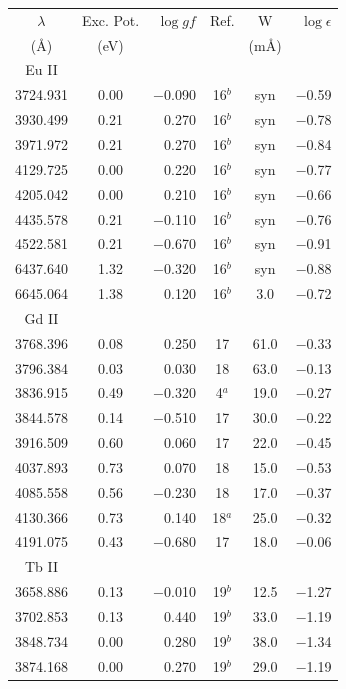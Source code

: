 \documentclass{aa}
\begin{document}
\begin{table}
\begin{tabular}{ccrccr}
\hline\hline
$\lambda$ & Exc. Pot. & $\log gf$ & Ref. & W & $\log \epsilon$ \\
  (\AA)   & (eV)      &           &      & (m\AA) &              \\ 
\hline
Eu II\\
\hline
3724.931 & 0.00 & $-$0.090 & 16$^{b}$ & syn  & $-$0.59\\
3930.499 & 0.21 &    0.270 & 16$^{b}$ & syn  & $-$0.78\\
3971.972 & 0.21 &    0.270 & 16$^{b}$ & syn  & $-$0.84\\
4129.725 & 0.00 &    0.220 & 16$^{b}$ & syn  & $-$0.77\\
4205.042 & 0.00 &    0.210 & 16$^{b}$ & syn  & $-$0.66\\
4435.578 & 0.21 & $-$0.110 & 16$^{b}$ & syn  & $-$0.76\\
4522.581 & 0.21 & $-$0.670 & 16$^{b}$ & syn  & $-$0.91\\
6437.640 & 1.32 & $-$0.320 & 16$^{b}$ & syn  & $-$0.88\\
6645.064 & 1.38 &    0.120 & 16$^{b}$ &  3.0 & $-$0.72\\
\hline
Gd II\\
\hline
3768.396 & 0.08 &    0.250 & 17 &  61.0 & $-$0.33\\
3796.384 & 0.03 &    0.030 & 18 &  63.0 & $-$0.13\\
3836.915 & 0.49 & $-$0.320 &  4$^{a}$ &  19.0 & $-$0.27\\
3844.578 & 0.14 & $-$0.510 & 17 &  30.0 & $-$0.22\\
3916.509 & 0.60 &    0.060 & 17 &  22.0 & $-$0.45\\
4037.893 & 0.73 &    0.070 & 18 &  15.0 & $-$0.53\\
4085.558 & 0.56 & $-$0.230 & 18 &  17.0 & $-$0.37\\
4130.366 & 0.73 &    0.140 & 18$^{a}$ &  25.0 & $-$0.32\\
4191.075 & 0.43 & $-$0.680 & 17 &  18.0 & $-$0.06\\
\hline
Tb II\\
\hline
3658.886 & 0.13 & $-$0.010 & 19$^{b}$ &  12.5 & $-$1.27\\
3702.853 & 0.13 &    0.440 & 19$^{b}$ &  33.0 & $-$1.19\\
3848.734 & 0.00 &    0.280 & 19$^{b}$ &  38.0 & $-$1.34\\
3874.168 & 0.00 &    0.270 & 19$^{b}$ &  29.0 & $-$1.19\\

\end{tabular}
\end{table}
\end{document}
